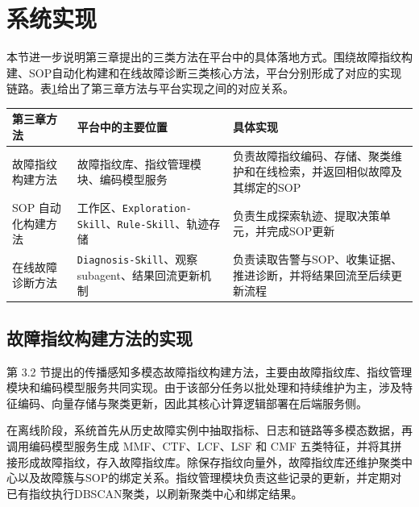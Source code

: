 
\section{系统实现}

本节进一步说明第三章提出的三类方法在平台中的具体落地方式。围绕故障指纹构建、SOP自动化构建和在线故障诊断三类核心方法，平台分别形成了对应的实现链路。表\ref{tab:chap3_chap4_impl}给出了第三章方法与平台实现之间的对应关系。

\begin{table}[htbp]
    \centering
    \label{tab:chap3_chap4_impl}
    \begingroup
    \small
    \setlength{\tabcolsep}{4pt}
    \renewcommand{\arraystretch}{1.25}
    \begin{tabularx}{\textwidth}{>{\raggedright\arraybackslash}p{3.3cm}>{\raggedright\arraybackslash}p{4.0cm}>{\raggedright\arraybackslash}X}
        \toprule
        \textbf{第三章方法} & \textbf{平台中的主要位置} & \textbf{具体实现} \\
        \midrule
        故障指纹构建方法 & 故障指纹库、指纹管理模块、编码模型服务 & 负责故障指纹编码、存储、聚类维护和在线检索，并返回相似故障及其绑定的SOP \\
        SOP 自动化构建方法 & 工作区、\texttt{Exploration-Skill}、\texttt{Rule-Skill}、轨迹存储 & 负责生成探索轨迹、提取决策单元，并完成SOP更新 \\
        在线故障诊断方法 & \texttt{Diagnosis-Skill}、观察 subagent、结果回流更新机制 & 负责读取告警与SOP、收集证据、推进诊断，并将结果回流至后续更新流程 \\
        \bottomrule
    \end{tabularx}
    \endgroup
\end{table}

\subsection{故障指纹构建方法的实现}

第 3.2 节提出的传播感知多模态故障指纹构建方法，主要由故障指纹库、指纹管理模块和编码模型服务共同实现。由于该部分任务以批处理和持续维护为主，涉及特征编码、向量存储与聚类更新，因此其核心计算逻辑部署在后端服务侧。

在离线阶段，系统首先从历史故障实例中抽取指标、日志和链路等多模态数据，再调用编码模型服务生成 MMF、CTF、LCF、LSF 和 CMF 五类特征，并将其拼接形成故障指纹，存入故障指纹库。除保存指纹向量外，故障指纹库还维护聚类中心以及故障簇与SOP的绑定关系。指纹管理模块负责这些记录的更新，并定期对已有指纹执行DBSCAN聚类，以刷新聚类中心和绑定结果。

